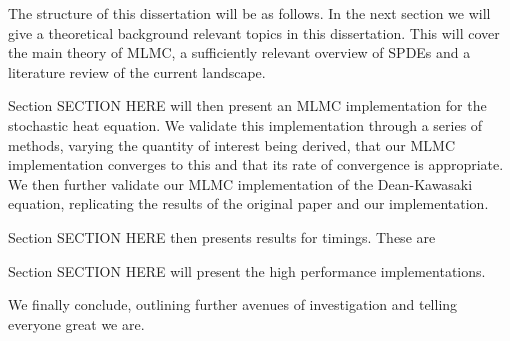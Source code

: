 The structure of this dissertation will be as follows. In the next section we will 
give a theoretical background relevant topics in this dissertation. This will cover 
the main theory of MLMC, a sufficiently relevant overview of SPDEs and a literature
review of the current landscape.

Section SECTION HERE will then present an MLMC implementation for the 
stochastic heat equation. We  validate this implementation through a series of methods, 
varying the quantity of interest being derived, that our MLMC implementation 
converges to this and that its rate of convergence is appropriate. We then 
further validate our MLMC implementation of the Dean-Kawasaki equation, replicating 
the results of the original paper and our implementation.

Section SECTION HERE then presents results for timings. These are 


Section SECTION HERE will present the high performance implementations. 

We finally conclude, outlining further avenues of investigation and telling everyone
great we are.

